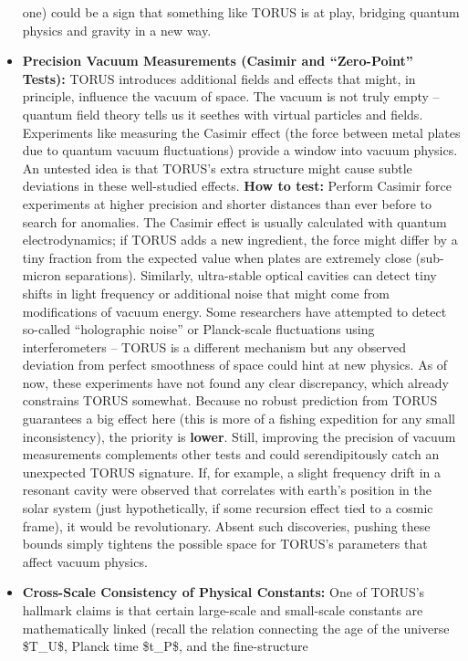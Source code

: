 \documentclass[]{article}
\begin{document}
\begin{itemize}
  one) could be a sign that something like TORUS is at play, bridging
  quantum physics and gravity in a new way.
\item
  \textbf{Precision Vacuum Measurements (Casimir and ``Zero-Point''
  Tests):} TORUS introduces additional fields and effects that might, in
  principle, influence the vacuum of space. The vacuum is not truly
  empty -- quantum field theory tells us it seethes with virtual
  particles and fields. Experiments like measuring the Casimir effect
  (the force between metal plates due to quantum vacuum fluctuations)
  provide a window into vacuum physics. An untested idea is that TORUS's
  extra structure might cause subtle deviations in these well-studied
  effects. \textbf{How to test:} Perform Casimir force experiments at
  higher precision and shorter distances than ever before to search for
  anomalies​. The Casimir effect is usually calculated with quantum
  electrodynamics; if TORUS adds a new ingredient, the force might
  differ by a tiny fraction from the expected value when plates are
  extremely close (sub-micron separations). Similarly, ultra-stable
  optical cavities can detect tiny shifts in light frequency or
  additional noise that might come from modifications of vacuum energy.
  Some researchers have attempted to detect so-called ``holographic
  noise'' or Planck-scale fluctuations using interferometers -- TORUS is
  a different mechanism but any observed deviation from perfect
  smoothness of space could hint at new physics​. As of now, these
  experiments have not found any clear discrepancy, which already
  constrains TORUS somewhat. Because no robust prediction from TORUS
  guarantees a big effect here (this is more of a fishing expedition for
  any small inconsistency), the priority is \textbf{lower}​. Still,
  improving the precision of vacuum measurements complements other tests
  and could serendipitously catch an unexpected TORUS signature. If, for
  example, a slight frequency drift in a resonant cavity were observed
  that correlates with earth's position in the solar system (just
  hypothetically, if some recursion effect tied to a cosmic frame), it
  would be revolutionary. Absent such discoveries, pushing these bounds
  simply tightens the possible space for TORUS's parameters that affect
  vacuum physics.
\item
  \textbf{Cross-Scale Consistency of Physical Constants:} One of TORUS's
  hallmark claims is that certain large-scale and small-scale constants
  are mathematically linked (recall the relation connecting the age of
  the universe \$T\_U\$, Planck time \$t\_P\$, and the fine-structure

\end{itemize}
\end{document}
